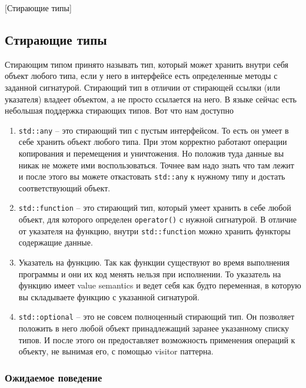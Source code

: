 [Стирающие типы]


\subsection{Стирающие типы}
\label{section::TypeErasure}

Стирающим типом принято называть тип, который может хранить внутри себя объект любого типа, если у него в интерфейсе есть определенные методы с заданной сигнатурой.
Стирающий тип в отличии от стирающей ссылки (или указателя) владеет объектом, а не просто ссылается на него.
В языке сейчас есть небольшая поддержка стирающих типов.
Вот что нам доступно
\begin{enumerate}
\item \verb"std::any" -- это стирающий тип с пустым интерфейсом.
То есть он умеет в себе хранить объект любого типа.
При этом корректно работают операции копирования и перемещения и уничтожения.
Но положив туда данные вы никак не можете ими воспользоваться.
Точнее вам надо знать что там лежит и после этого вы можете откастовать \verb"std::any" к нужному типу и достать соответствующий объект.

\item \verb"std::function" -- это стирающий тип, который умеет хранить в себе любой объект, для которого определен \verb"operator()" с нужной сигнатурой.
В отличие от указателя на функцию, внутри \verb"std::function" можно хранить функторы содержащие данные.

\item Указатель на функцию.
Так как функции существуют во время выполнения программы и они их код менять нельзя при исполнении.
То указатель на функцию имеет value semantics и ведет себя как будто переменная, в которую вы складываете функцию с указанной сигнатурой.

\item \verb"std::optional" -- это не совсем полноценный стирающий тип.
Он позволяет положить в него любой объект принадлежащий заранее указанному списку типов.
И после этого он предоставляет возможность применения операций к объекту, не вынимая его, с помощью visitor паттерна.
\end{enumerate}

\subsubsection{Ожидаемое поведение}

